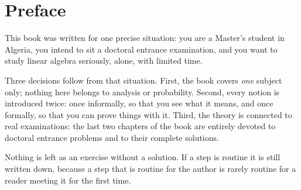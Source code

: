 \documentclass[print]{docmathdz}
\begin{document}

\chapter*{Preface}

This book was written for one precise situation: you are a Master's student in
Algeria, you intend to sit a doctoral entrance examination, and you want to study
linear algebra seriously, alone, with limited time.

Three decisions follow from that situation. First, the book covers \emph{one}
subject only; nothing here belongs to analysis or probability. Second, every
notion is introduced twice: once informally, so that you see what it means, and
once formally, so that you can prove things with it. Third, the theory is
connected to real examinations: the last two chapters of the book are entirely
devoted to doctoral entrance problems and to their complete solutions.

Nothing is left as an exercise without a solution. If a step is routine it is
still written down, because a step that is routine for the author is rarely
routine for a reader meeting it for the first time.
\end{document}
